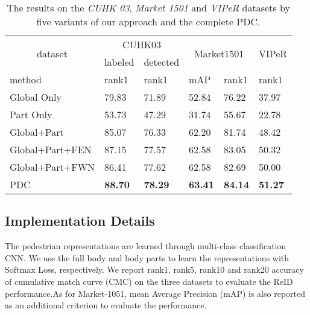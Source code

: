 \documentclass[10pt,twocolumn,letterpaper]{article}
\begin{document}
\begin{table}
\caption{The results on the \emph{CUHK 03}, \emph{Market 1501} and \emph{VIPeR} datasets by five variants of our approach and the complete PDC.}
\vspace{-3mm}
\label{table:components}
\footnotesize
\begin{center}
\begin{tabular}{|p{2.4cm}|p{0.8cm}<{\centering}|p{0.8cm}<{\centering}|p{0.5cm}<{\centering}|p{0.5cm}<{\centering}|p{0.6cm}<{\centering}|}
\hline
\multicolumn{1}{|c|}{\multirow{2}{*}{dataset}}&\multicolumn{2}{c|}{CUHK03}&\multicolumn{2}{c|}{\multirow{2}{*}{Market1501}}&\multirow{2}{*}{VIPeR}\\
\cline{2-3}
    &labeled& detected&\multicolumn{2}{c|}{}&\\
 \hline
method               &rank1      &rank1       &mAP         &rank1        &rank1\\
\hline
Global Only             &79.83	     &71.89       &52.84       &76.22        &37.97\\
Part Only            &53.73      &47.29       &31.74       &55.67        &22.78\\
Global+Part        &85.07      &76.33       &62.20       &81.74        &48.42\\
Global+Part+FEN  &87.15      &77.57       &62.58       &83.05        &50.32\\
Global+Part+FWN  &86.41      &77.62       &62.58       &82.69        &50.00\\
PDC            &{\bf88.70} &{\bf78.29}  &{\bf63.41}  &{\bf84.14}   &{\bf51.27}\\
\hline
\end{tabular}
\end{center}
\vspace{-6mm}
\end{table}

\subsection{Implementation Details}
\label{sec:implement}

The pedestrian representations are learned through multi-class classification CNN. We use the full body and body parts to learn the representations with Softmax Loss, respectively. We report rank1, rank5, rank10 and rank20 accuracy of cumulative match
curve (CMC) on the three datasets to evaluate the ReID performance.As for Market-1051, mean Average Precision (mAP) is also reported as an additional criterion to evaluate the performance.
\end{document}
